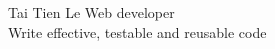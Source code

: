\begin{center}
\bigbreak
{\Huge Tai Tien Le}
\bigbreak
Web developer\\
Write effective, testable and reusable code
\end{center}

